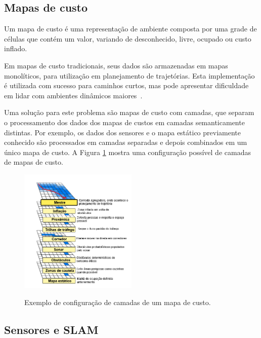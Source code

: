 \documentclass[repeatfields,xlists,xpacks,oneside,yearsonly]{ufrgscca}
\begin{document}
\subsection{Mapas de custo}

Um mapa de custo é uma representação de ambiente composta por uma
grade de células que contém um valor, variando de desconhecido,
livre, ocupado ou custo inflado.

Em mapas de custo tradicionais, seus dados são armazenadas em mapas
monolíticos, para utilização em planejamento de trajetórias. Esta
implementação é utilizada com sucesso para caminhos curtos, mas pode
apresentar dificuldade em lidar com ambientes dinâmicos
maiores~\cite{layered_costmaps}.

Uma solução para este problema são mapas de custo com camadas, que
separam o processamento dos dados dos mapas de custos em camadas
semanticamente distintas. Por exemplo, os dados dos sensores e o mapa
estático previamente conhecido são processados em camadas separadas e
depois combinados em um único mapa de custo. A Figura
\ref{fig:mapa_camadas} mostra uma configuração possível de camadas de
mapas de custo. 

\begin{figure}[h]
    {
        \centering
        \caption{Exemplo de configuração de camadas de um mapa de custo.}
        \label{fig:mapa_camadas}
        \includegraphics[width=0.5\textwidth]{mapa_camadas_trad.png}\\
    }
    {}
\end{figure}
\subsection{Sensores e SLAM}
\end{document}
